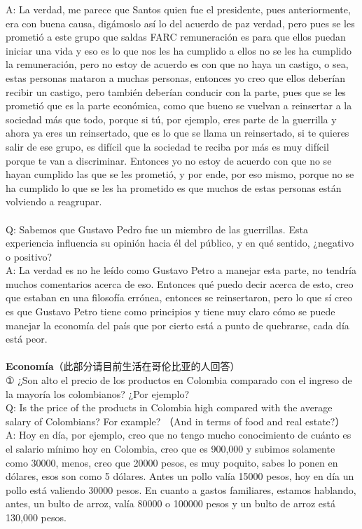 \documentclass{phyasgn}\usepackage{nag}
\begin{document}
A: La verdad, me parece que Santos quien fue el presidente, pues anteriormente, era con buena causa, digámoslo así lo del acuerdo de paz verdad, pero pues se les prometió a este grupo que saldas FARC remuneración es para que ellos puedan iniciar una vida y eso es lo que nos les ha cumplido a ellos no se les ha cumplido la remuneración, pero no estoy de acuerdo es con que no haya un castigo, o sea, estas personas mataron a muchas personas, entonces yo creo que ellos deberían recibir un castigo, pero también deberían conducir con la parte, pues que se les prometió que es la parte económica, como que bueno se vuelvan a reinsertar a la sociedad más que todo, porque si tú, por ejemplo, eres parte de la guerrilla y ahora ya eres un reinsertado, que es lo que se llama un reinsertado, si te quieres salir de ese grupo, es difícil que la sociedad te reciba por más es muy difícil porque te van a discriminar. Entonces yo no estoy de acuerdo con que no se hayan cumplido las que se les prometió, y por ende, por eso mismo, porque no se ha cumplido lo que se les ha prometido es que muchos de estas personas están volviendo a reagrupar.\\
\\
Q: Sabemos que Gustavo Pedro fue un miembro de las guerrillas. Esta experiencia influencia su opinión hacia él del público, y en qué sentido, ¿negativo o positivo?\\
A: La verdad es no he leído como Gustavo Petro a manejar esta parte, no tendría muchos comentarios acerca de eso. Entonces qué puedo decir acerca de esto, creo que estaban en una filosofía errónea, entonces se reinsertaron, pero lo que sí creo es que Gustavo Petro tiene como principios y tiene muy claro cómo se puede manejar la economía del país que por cierto está a punto de quebrarse, cada día está peor.\\
\\
\textbf{Economía}（此部分请目前生活在哥伦比亚的人回答）\\
① ¿Son alto el precio de los productos en Colombia comparado con el ingreso de la mayoría los colombianos? ¿Por ejemplo? \\
	Q: Is the price of the products in Colombia high compared with the average salary of Colombians? For example? （And in terms of food and real estate?） \\
A: Hoy en día, por ejemplo, creo que no tengo mucho conocimiento de cuánto es el salario mínimo hoy en Colombia, creo que es 900,000 y subimos solamente como 30000, menos, creo que 20000 pesos, es muy poquito, sabes lo ponen en dólares, esos son como 5 dólares. Antes un pollo valía 15000 pesos, hoy en día un pollo está valiendo 30000 pesos. En cuanto a gastos familiares, estamos hablando, antes, un bulto de arroz, valía 80000 o 100000 pesos y un bulto de arroz está 130,000 pesos.\\
\end{document}
